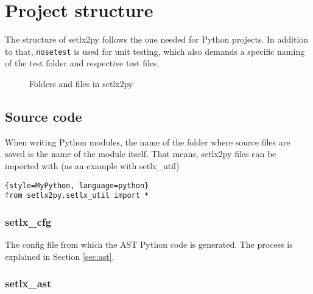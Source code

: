 
\section{Project structure}

The structure of setlx2py follows the one needed for Python projects. In addition to that, \texttt{nosetest} is used for unit testing, which also demands a specific naming of the test folder and respective test files.

\begin{figure}[ht]
\caption{Folders and files in setlx2py}
\end{figure}

%
%
\clearpage
\subsection{Source code}

When writing Python modules, the name of the folder where source files are saved is the name of the module itself. That means, setlx2py files can be imported with (as an example with setlx\_util)

\begin{lstlisting}{style=MyPython, language=python}
from setlx2py.setlx_util import *
\end{lstlisting}

%
\subsubsection{setlx\_cfg}

The config file from which the AST Python code is generated. The process is explained in Section \ref{sec:ast}.

%
\subsubsection{setlx\_ast}

